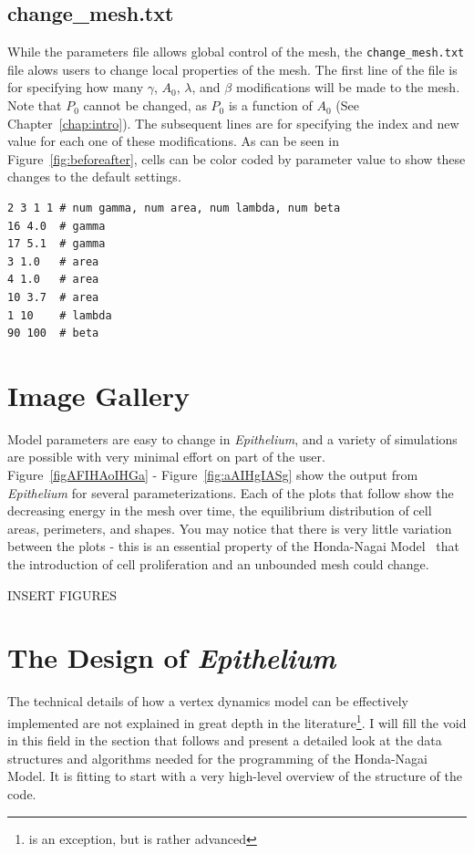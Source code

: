 \subsection{change\_mesh.txt}
While the parameters file allows global control of the mesh, the \texttt{change\_mesh.txt} file alows users to change local properties of the mesh. The first line of the file is for specifying how many $\gamma$, $A_0$, $\lambda$, and $\beta$ modifications will be made to the mesh. Note that $P_0$ cannot be changed, as $P_0$ is a function of $A_0$ (See Chapter~\ref{chap:intro}). The subsequent lines are for specifying the index and new value for each one of these modifications. As can be seen in Figure~\ref{fig:beforeafter}, cells can be color coded by parameter value to show these changes to the default settings.
\begin{lstlisting}
2 3 1 1 # num gamma, num area, num lambda, num beta
16 4.0  # gamma
17 5.1  # gamma
3 1.0   # area
4 1.0   # area
10 3.7  # area
1 10    # lambda
90 100  # beta
\end{lstlisting}

\section{Image Gallery}
Model parameters are easy to change in \emph{Epithelium}, and a variety of simulations are possible with very minimal effort on part of the user. Figure~\ref{figAFIHAoIHGa} - Figure~\ref{fig:aAIHgIASg} show the output from \emph{Epithelium} for several parameterizations. Each of the plots that follow show the decreasing energy in the mesh over time, the equilibrium distribution of cell areas, perimeters, and shapes. You may notice that there is very little variation between the plots - this is an essential property of the Honda-Nagai Model~\cite{HondaNagai} that the introduction of cell proliferation and an unbounded mesh could change.  

INSERT FIGURES

\section{The Design of \emph{Epithelium}}
The technical details of how a vertex dynamics model can be effectively implemented are not explained in great depth in the literature\footnote{\cite{ChasteMain} is an exception, but is rather advanced}. I will fill the void in this field in the section that follows and present a detailed look at the data structures and algorithms needed for the programming of the Honda-Nagai Model. It is fitting to start with a very high-level overview of the structure of the code.

